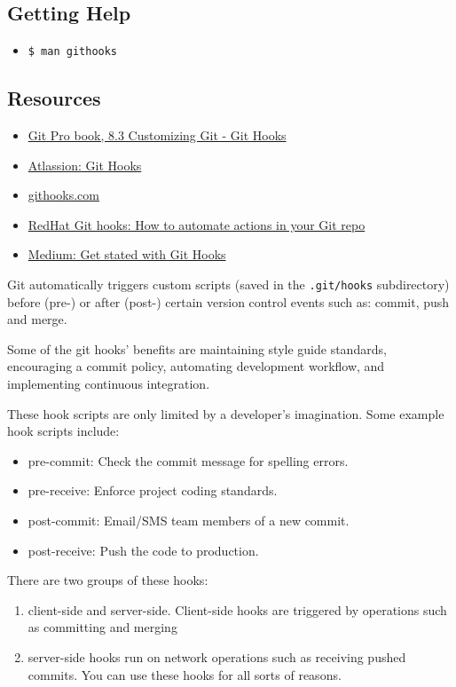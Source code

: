 \subsection{Getting Help}%
\begin{itemize}
  \item \texttt{\$ man githooks}
\end{itemize}

\subsection{Resources}%
\begin{itemize}
  \item \href{https://git-scm.com/book/en/v2/Customizing-Git-Git-Hooks}{Git Pro book, 8.3 Customizing Git - Git Hooks} 
  \item \href{https://www.atlassian.com/git/tutorials/git-hooks}{Atlassion: Git Hooks} 
  \item \href{https://githooks.com/}{githooks.com} 
  \item \href{https://www.redhat.com/sysadmin/git-hooks}{RedHat Git hooks: How to automate actions in your Git repo}
  \item \href{https://medium.com/@f3igao/get-started-with-git-hooks-5a489725c639}{Medium: Get stated with Git Hooks} 
\end{itemize}
Git automatically triggers custom scripts (saved in the \texttt{.git/hooks} subdirectory) before (pre-) or after (post-) certain version control events such as: commit, push and merge.

Some of the git hooks' benefits are maintaining style guide standards, encouraging a commit policy, automating development workflow, and implementing continuous integration.

These hook scripts are only limited by a developer's imagination. Some example hook scripts include:
\begin{itemize}
  \item    pre-commit: Check the commit message for spelling errors.
  \item    pre-receive: Enforce project coding standards.
  \item    post-commit: Email/SMS team members of a new commit.
  \item    post-receive: Push the code to production.
\end{itemize}


There are two groups of these hooks: 

\begin{enumerate}
  \item client-side and server-side. Client-side hooks are triggered by operations such as committing and merging
  \item server-side hooks run on network operations such as receiving pushed commits. You can use these hooks for all sorts of reasons.
\end{enumerate}




